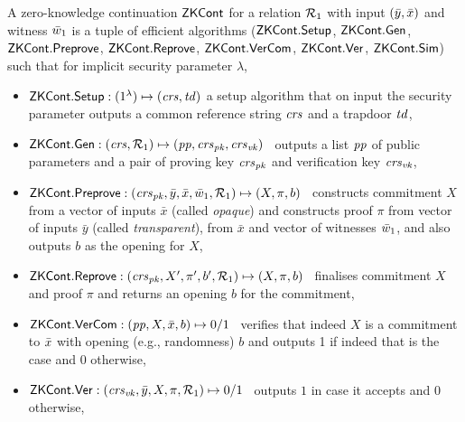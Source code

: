 \begin{definition}[ZK Continuations]
\label{def:zk_cont}
 A zero-knowledge continuation ${\mathsf{ZKCont}}$ for a relation $\mathcal{R}_1$ with 
input $(\bar{y}, \bar{x})$ and witness $\bar{w}_1$ is a tuple of efficient algorithms 
(${\mathsf{ZKCont}}.{\mathsf{Setup}}$, ${\mathsf{ZKCont}}.\mathsf{Gen}$, ${\mathsf{ZKCont}}.{\mathsf{Preprove}}$, ${\mathsf{ZKCont}}.{\mathsf{Reprove}}$, ${\mathsf{ZKCont}}.{\mathsf{VerCom}}$, ${\mathsf{ZKCont}}.{\mathsf{Ver}}$, ${\mathsf{ZKCont}}.{\mathsf{Sim}}$) 
such that for implicit security parameter $\lambda$,
\begin{itemize}

\item ${\mathsf{ZKCont}}.{\mathsf{Setup}}: (1^{\lambda}) \mapsto (\mathit{crs}, \mathit{td})$ a setup algorithm that on input the security parameter 
outputs a common reference string $\mathit{crs}$ and a trapdoor $\mathit{td}$,

\item ${\mathsf{ZKCont}}.\mathsf{Gen}: (\mathit{crs}, \mathcal{R}_1) \mapsto (\mathit{pp}, \mathit{crs}_{\mathit{pk}}, \mathit{crs}_{\mathit{vk}})$ \, 
outputs a list $\mathit{pp}$ of public parameters and a pair of proving key $\mathit{crs}_{\mathit{pk}}$ and verification key $\mathit{crs}_{\mathit{vk}}$, 

\item ${\mathsf{ZKCont}}.{\mathsf{Preprove}}: (\mathit{crs}_{\mathit{pk}}, \bar{y}, \bar{x}, \bar{w}_1, \mathcal{R}_1) \mapsto (X, \pi, b)$ \,
constructs commitment $X$ from a vector of inputs $\bar{x}$ (called \emph{opaque}) and 
constructs proof $\pi$ from vector of inputs 
$\bar{y}$ (called \emph{transparent}), from $\bar{x}$ and vector of witnesses $\bar{w}_1$, and 
also outputs $b$ as the opening for $X$,

\item ${\mathsf{ZKCont}}.{\mathsf{Reprove}}: (\mathit{crs}_{\mathit{pk}}, X', \pi', b', \mathcal{R}_1) \mapsto (X, \pi, b)$ \,
finalises commitment $X$ and proof $\pi$ and returns an opening $b$ for the commitment, 

\item ${\mathsf{ZKCont}}.{\mathsf{VerCom}}: (\mathit{pp}, X, \bar{x}, b) \mapsto 0/1$ \, 
verifies that indeed $X$ is a commitment to $\bar{x}$ with opening (e.g., randomness) $b$ and 
outputs 1 if indeed that is the case and 0 otherwise,
 
\item ${\mathsf{ZKCont}}.{\mathsf{Ver}}: (\mathit{crs}_{\mathit{vk}}, \bar{y}, X, \pi, \mathcal{R}_1) \mapsto 0/1$ \, outputs $1$ in case it accepts and $0$ otherwise,


\end{itemize}
\end{definition}
